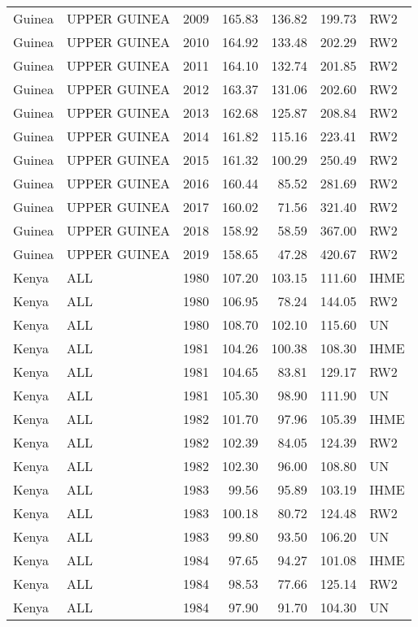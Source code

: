\begin{longtable}{lllrrrl}
  Guinea & UPPER GUINEA & 2009 & 165.83 & 136.82 & 199.73 & RW2 \\ 
  Guinea & UPPER GUINEA & 2010 & 164.92 & 133.48 & 202.29 & RW2 \\ 
  Guinea & UPPER GUINEA & 2011 & 164.10 & 132.74 & 201.85 & RW2 \\ 
  Guinea & UPPER GUINEA & 2012 & 163.37 & 131.06 & 202.60 & RW2 \\ 
  Guinea & UPPER GUINEA & 2013 & 162.68 & 125.87 & 208.84 & RW2 \\ 
  Guinea & UPPER GUINEA & 2014 & 161.82 & 115.16 & 223.41 & RW2 \\ 
  Guinea & UPPER GUINEA & 2015 & 161.32 & 100.29 & 250.49 & RW2 \\ 
  Guinea & UPPER GUINEA & 2016 & 160.44 & 85.52 & 281.69 & RW2 \\ 
  Guinea & UPPER GUINEA & 2017 & 160.02 & 71.56 & 321.40 & RW2 \\ 
  Guinea & UPPER GUINEA & 2018 & 158.92 & 58.59 & 367.00 & RW2 \\ 
  Guinea & UPPER GUINEA & 2019 & 158.65 & 47.28 & 420.67 & RW2 \\ 
  Kenya & ALL & 1980 & 107.20 & 103.15 & 111.60 & IHME \\ 
  Kenya & ALL & 1980 & 106.95 & 78.24 & 144.05 & RW2 \\ 
  Kenya & ALL & 1980 & 108.70 & 102.10 & 115.60 & UN \\ 
  Kenya & ALL & 1981 & 104.26 & 100.38 & 108.30 & IHME \\ 
  Kenya & ALL & 1981 & 104.65 & 83.81 & 129.17 & RW2 \\ 
  Kenya & ALL & 1981 & 105.30 & 98.90 & 111.90 & UN \\ 
  Kenya & ALL & 1982 & 101.70 & 97.96 & 105.39 & IHME \\ 
  Kenya & ALL & 1982 & 102.39 & 84.05 & 124.39 & RW2 \\ 
  Kenya & ALL & 1982 & 102.30 & 96.00 & 108.80 & UN \\ 
  Kenya & ALL & 1983 & 99.56 & 95.89 & 103.19 & IHME \\ 
  Kenya & ALL & 1983 & 100.18 & 80.72 & 124.48 & RW2 \\ 
  Kenya & ALL & 1983 & 99.80 & 93.50 & 106.20 & UN \\ 
  Kenya & ALL & 1984 & 97.65 & 94.27 & 101.08 & IHME \\ 
  Kenya & ALL & 1984 & 98.53 & 77.66 & 125.14 & RW2 \\ 
  Kenya & ALL & 1984 & 97.90 & 91.70 & 104.30 & UN \\ 

\end{longtable}
